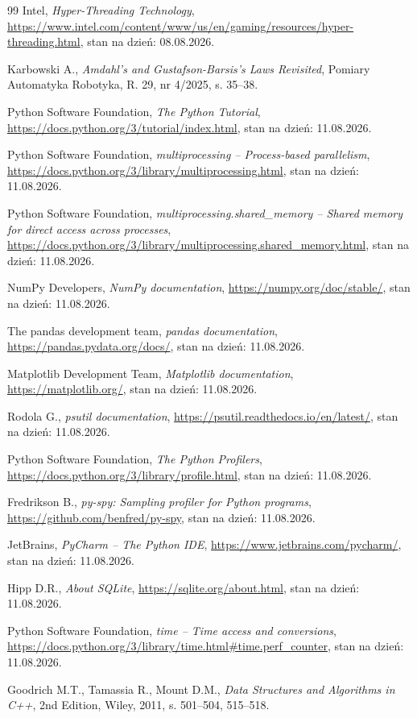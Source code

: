 \begin{thebibliography}{99}
Intel, \textit{Hyper-Threading Technology}, \url{https://www.intel.com/content/www/us/en/gaming/resources/hyper-threading.html}, stan na dzień: 08.08.2026.

Karbowski A., \textit{Amdahl's and Gustafson-Barsis's Laws Revisited}, Pomiary Automatyka Robotyka, R. 29, nr 4/2025, s. 35--38.

Python Software Foundation, \textit{The Python Tutorial}, \url{https://docs.python.org/3/tutorial/index.html}, stan na dzień: 11.08.2026.

Python Software Foundation, \textit{multiprocessing -- Process-based parallelism}, \url{https://docs.python.org/3/library/multiprocessing.html}, stan na dzień: 11.08.2026.

Python Software Foundation, \textit{multiprocessing.shared\_memory -- Shared memory for direct access across processes}, \url{https://docs.python.org/3/library/multiprocessing.shared_memory.html}, stan na dzień: 11.08.2026.

NumPy Developers, \textit{NumPy documentation}, \url{https://numpy.org/doc/stable/}, stan na dzień: 11.08.2026.

The pandas development team, \textit{pandas documentation}, \url{https://pandas.pydata.org/docs/}, stan na dzień: 11.08.2026.

Matplotlib Development Team, \textit{Matplotlib documentation}, \url{https://matplotlib.org/}, stan na dzień: 11.08.2026.

Rodola G., \textit{psutil documentation}, \url{https://psutil.readthedocs.io/en/latest/}, stan na dzień: 11.08.2026.

Python Software Foundation, \textit{The Python Profilers}, \url{https://docs.python.org/3/library/profile.html}, stan na dzień: 11.08.2026.

Fredrikson B., \textit{py-spy: Sampling profiler for Python programs}, \url{https://github.com/benfred/py-spy}, stan na dzień: 11.08.2026.

JetBrains, \textit{PyCharm -- The Python IDE}, \url{https://www.jetbrains.com/pycharm/}, stan na dzień: 11.08.2026.

Hipp D.R., \textit{About SQLite}, \url{https://sqlite.org/about.html}, stan na dzień: 11.08.2026.

Python Software Foundation, \textit{time -- Time access and conversions}, \url{https://docs.python.org/3/library/time.html#time.perf_counter}, stan na dzień: 11.08.2026.

Goodrich M.T., Tamassia R., Mount D.M., \textit{Data Structures and Algorithms in C++}, 2nd Edition, Wiley, 2011, s. 501--504, 515--518.

\end{thebibliography}
